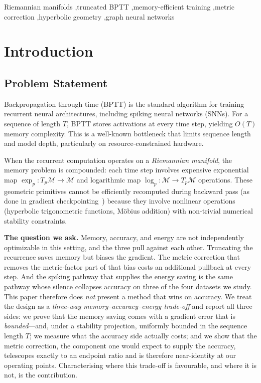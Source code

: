 \documentclass[a4paper,fleqn]{cas-dc}
\begin{document}
\begin{keywords}
Riemannian manifolds \sep truncated BPTT \sep memory-efficient training \sep metric correction \sep hyperbolic geometry \sep graph neural networks
\end{keywords}

\maketitle

\section{Introduction}
\label{sec:intro}

\subsection{Problem Statement}

Backpropagation through time (BPTT) is the standard algorithm for training recurrent neural architectures, including spiking neural networks (SNNs). For a sequence of length $T$, BPTT stores activations at every time step, yielding $O(T)$ memory complexity. This is a well-known bottleneck that limits sequence length and model depth, particularly on resource-constrained hardware.

When the recurrent computation operates on a \textit{Riemannian manifold}, the memory problem is compounded: each time step involves expensive exponential map $\exp_p: T_p\mathcal{M} \to \mathcal{M}$ and logarithmic map $\log_p: \mathcal{M} \to T_p\mathcal{M}$ operations. These geometric primitives cannot be efficiently recomputed during backward pass (as done in gradient checkpointing~\citep{Chen16Checkpoint}) because they involve nonlinear operations (hyperbolic trigonometric functions, M\"obius addition) with non-trivial numerical stability constraints.

\textbf{The question we ask.} Memory, accuracy, and energy are not independently optimizable in this setting, and the three pull against each other. Truncating the recurrence saves memory but biases the gradient. The metric correction that removes the metric-factor part of that bias costs an additional pullback at every step. And the spiking pathway that supplies the energy saving is the same pathway whose silence collapses accuracy on three of the four datasets we study. This paper therefore does \emph{not} present a method that wins on accuracy. We treat the design as a \emph{three-way memory--accuracy--energy trade-off} and report all three sides: we prove that the memory saving comes with a gradient error that is \emph{bounded}---and, under a stability projection, uniformly bounded in the sequence length $T$; we measure what the accuracy side actually costs; and we show that the metric correction, the component one would expect to supply the accuracy, telescopes exactly to an endpoint ratio and is therefore near-identity at our operating points. Characterising where this trade-off is favourable, and where it is not, is the contribution.
\end{document}
